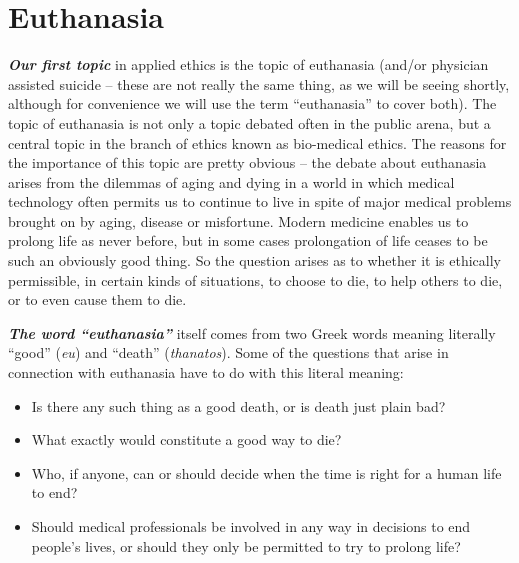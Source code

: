 \documentclass[
  12pt, openany]{book}
\makeatletter
\providecommand{\tightlist}{%
  \setlength{\itemsep}{0pt}\setlength{\parskip}{0pt}}
\newenvironment{kframe}{%
\medskip{}
\setlength{\fboxsep}{.8em}
 \def\at@end@of@kframe{}%
 \ifinner\ifhmode%
  \def\at@end@of@kframe{\end{minipage}}%
  \begin{minipage}{\columnwidth}%
 \fi\fi%
 \def\FrameCommand##1{\hskip\@totalleftmargin \hskip-\fboxsep
 \colorbox{shadecolor}{##1}\hskip-\fboxsep
     \hskip-\linewidth \hskip-\@totalleftmargin \hskip\columnwidth}%
 \MakeFramed {\advance\hsize-\width
   \@totalleftmargin\z@ \linewidth\hsize
   \@setminipage}}%
 {\par\unskip\endMakeFramed%
 \at@end@of@kframe}
\newenvironment{rmdblock}[1]
  {
  \begin{itemize}
  \renewcommand{\labelitemi}{
    \raisebox{-.7\height}[0pt][0pt]{
      {\setkeys{Gin}{width=3em,keepaspectratio}\texttt{[image: img/\#1]}}
    }
  }
  \setlength{\fboxsep}{1em}
  \begin{kframe}
  \item
  }
  {
  \end{kframe}
  \end{itemize}
  }
\newenvironment{question}
  {\begin{rmdblock}{question}}
  {\end{rmdblock}}
\makeatother
\begin{document}
\hypertarget{euthanasia}{%
\chapter{Euthanasia}\label{euthanasia}}

\textbf{\emph{Our first topic}} in applied ethics is the topic of euthanasia (and/or physician assisted suicide -- these are not really the same thing, as we will be seeing shortly, although for convenience we will use the term ``euthanasia'' to cover both). The topic of euthanasia is not only a topic debated often in the public arena, but a central topic in the branch of ethics known as bio-medical ethics. The reasons for the importance of this topic are pretty obvious -- the debate about euthanasia arises from the dilemmas of aging and dying in a world in which medical technology often permits us to continue to live in spite of major medical problems brought on by aging, disease or misfortune. Modern medicine enables us to prolong life as never before, but in some cases prolongation of life ceases to be such an obviously good thing. So the question arises as to whether it is ethically permissible, in certain kinds of situations, to choose to die, to help others to die, or to even cause them to die.

\textbf{\emph{The word ``euthanasia''}} itself comes from two Greek words meaning literally ``good'' (\emph{eu}) and ``death'' (\emph{thanatos}). Some of the questions that arise in connection with euthanasia have to do with this literal meaning:

\begin{question}

\begin{itemize}
\tightlist
\item
  Is there any such thing as a good death, or is death just plain bad?
\item
  What exactly would constitute a good way to die?
\item
  Who, if anyone, can or should decide when the time is right for a human life to end?
\item
  Should medical professionals be involved in any way in decisions to end people's lives, or should they only be permitted to try to prolong life?
\end{itemize}

\end{question}
\end{document}
